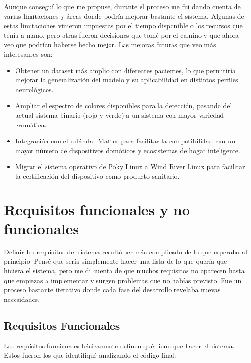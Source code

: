 Aunque conseguí lo que me propuse, durante el proceso me fui dando cuenta de varias limitaciones y áreas donde podría mejorar bastante el sistema. Algunas de estas limitaciones vinieron impuestas por el tiempo disponible o los recursos que tenía a mano, pero otras fueron decisiones que tomé por el camino y que ahora veo que podrían haberse hecho mejor. Las mejoras futuras que veo más interesantes son:

\begin{itemize}
    \item Obtener un dataset más amplio con diferentes pacientes, lo que permitiría mejorar la generalización del modelo y su aplicabilidad en distintos perfiles neurológicos.
    \item Ampliar el espectro de colores disponibles para la detección, pasando del actual sistema binario (rojo y verde) a un sistema con mayor variedad cromática.
    \item Integración con el estándar Matter para facilitar la compatibilidad con un mayor número de dispositivos domóticos y ecosistemas de hogar inteligente.
    \item Migrar el sistema operativo de Poky Linux a Wind River Linux para facilitar la certificación del dispositivo como producto sanitario.
\end{itemize}

\newpage

\section{Requisitos funcionales y no funcionales}

Definir los requisitos del sistema resultó ser más complicado de lo que esperaba al principio. Pensé que sería simplemente hacer una lista de lo que quería que hiciera el sistema, pero me di cuenta de que muchos requisitos no aparecen hasta que empiezas a implementar y surgen problemas que no habías previsto. Fue un proceso bastante iterativo donde cada fase del desarrollo revelaba nuevas necesidades.

\subsection{Requisitos Funcionales}

Los requisitos funcionales básicamente definen qué tiene que hacer el sistema. Estos fueron los que identifiqué analizando el código final:

